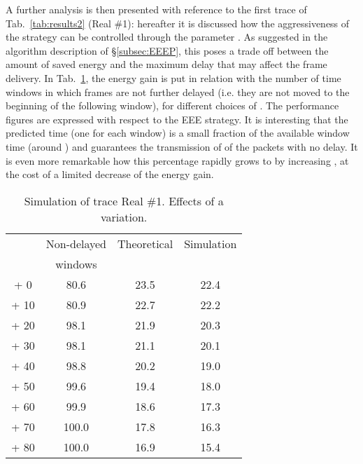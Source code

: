 \documentclass[journal,10pt,twoside,final]{IEEEtran}
\begin{document}
A further analysis is then presented with reference to the first trace of Tab.~\ref{tab:results2}  (Real \#1): 
hereafter it is discussed how the aggressiveness of the strategy can be controlled through the parameter . As suggested in the algorithm description of \S\ref{subsec:EEEP}, this poses a trade off between the amount of saved energy and the maximum delay that may affect the frame delivery. 
In Tab.~\ref{tab:results}, the energy gain  is put in relation with the number of time windows in which frames are not further delayed (i.e. they are not moved to the beginning of the following window), for different choices of .
The performance figures  are expressed with respect to the EEE strategy. It is interesting that the predicted time  (one for each window) is a small fraction of the available window time  (around ) and guarantees the transmission of  of the packets with no delay. 
It is even more remarkable how this percentage rapidly grows to  by increasing , at the cost of a limited decrease of the energy gain.
\begin{table}[h]
\caption{Simulation of trace Real \#1. Effects of a  variation. }
\label{tab:results}
\begin{center}
\begin{tabular}{|c|c|c|c|}
\hline 
 & Non-delayed & Theoretical & Simulation  \\
                            & windows &   &    \\
\hline
+ 0 & 80.6  & 23.5 & 22.4 \\
+ 10 & 80.9 & 22.7 & 22.2 \\
+ 20 & 98.1 & 21.9 & 20.3 \\
+ 30 & 98.1 & 21.1 & 20.1 \\
+ 40 & 98.8 & 20.2 & 19.0 \\
+ 50 & 99.6 & 19.4 & 18.0 \\
+ 60 & 99.9 & 18.6 & 17.3 \\
+ 70 & 100.0 & 17.8 & 16.3 \\
+ 80 & 100.0 & 16.9 & 15.4 \\
\hline
\end{tabular}
\end{center}
\end{table}
\end{document}
